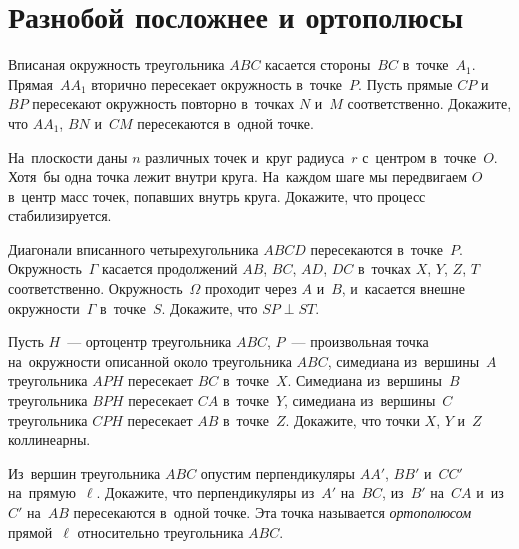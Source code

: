 
\section*{Разнобой посложнее и ортополюсы}


\begin{problems}

\item
Вписаная окружность треугольника $ABC$ касается стороны~$BC$ в~точке~$A_1$.
Прямая~$A A_1$ вторично пересекает окружность в~точке~$P$.
Пусть прямые $CP$ и~$BP$ пересекают окружность повторно в~точках $N$ и~$M$
соответственно.
Докажите, что $A A_1$, $BN$ и~$CM$ пересекаются в~одной точке.

\item
На~плоскости даны $n$ различных точек и~круг радиуса~$r$ с~центром в~точке~$O$.
Хотя~бы одна точка лежит внутри круга.
На~каждом шаге мы передвигаем $O$ в~центр масс точек, попавших внутрь круга.
Докажите, что процесс стабилизируется.

\item
Диагонали вписанного четырехугольника $ABCD$ пересекаются в~точке~$P$.
Окружность~$\Gamma$ касается продолжений $AB$, $BC$, $AD$, $DC$ в~точках
$X$, $Y$, $Z$, $T$ соответственно.
Окружность~$\Omega$ проходит через $A$ и~$B$, и~касается внешне
окружности~$\Gamma$ в~точке~$S$.
Докажите, что $SP \perp ST$.

\item
Пусть $H$~--- ортоцентр треугольника $ABC$, $P$~--- произвольная точка
на~окружности описанной около треугольника $ABC$, симедиана из~вершины~$A$
треугольника $APH$ пересекает $BC$ в~точке~$X$.
Симедиана из~вершины~$B$ треугольника $BPH$ пересекает $CA$ в~точке~$Y$,
симедиана из~вершины~$C$ треугольника $CPH$ пересекает $AB$ в~точке~$Z$.
Докажите, что точки $X$, $Y$ и~$Z$ коллинеарны.

\item
Из~вершин треугольника $ABC$ опустим перпендикуляры $AA'$, $BB'$ и~$CC'$
на~прямую~$\ell$.
Докажите, что перпендикуляры из~$A'$ на~$BC$, из~$B'$ на~$CA$ и~из~$C'$ на~$AB$
пересекаются в~одной точке.
Эта точка называется \emph{ортополюсом} прямой~$\ell$ относительно
треугольника $ABC$.


\end{problems}
